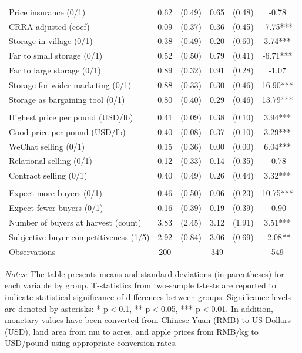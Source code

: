 \documentclass[12pt]{article}
\begin{document}
\begin{table}[H]
{\begin{tabular}{lccccc}
Price insurance (0/1) & 0.62 & (0.49) & 0.65 & (0.48) & -0.78 \\
CRRA adjusted (coef) & 0.09 & (0.37) & 0.36 & (0.45) & -7.75*** \\
Storage in village (0/1) & 0.38 & (0.49) & 0.20 & (0.60) & 3.74*** \\
Far to small storage (0/1) & 0.52 & (0.50) & 0.79 & (0.41) & -6.71*** \\
Far to large storage (0/1) & 0.89 & (0.32) & 0.91 & (0.28) & -1.07 \\
Storage for wider marketing (0/1) & 0.88 & (0.33) & 0.30 & (0.46) & 16.90*** \\
Storage as bargaining tool (0/1) & 0.80 & (0.40) & 0.29 & (0.46) & 13.79*** \\
\addlinespace
\multicolumn{6}{l}{\textbf{Panel D: Marketing}} \\
Highest price per pound (USD/lb) & 0.41 & (0.09) & 0.38 & (0.10) & 3.94*** \\
Good price per pound (USD/lb) & 0.40 & (0.08) & 0.37 & (0.10) & 3.29*** \\
WeChat selling (0/1) & 0.15 & (0.36) & 0.00 & (0.00) & 6.04*** \\
Relational selling (0/1) & 0.12 & (0.33) & 0.14 & (0.35) & -0.78 \\
Contract selling (0/1) & 0.40 & (0.49) & 0.26 & (0.44) & 3.32*** \\
\addlinespace
\multicolumn{6}{l}{\textbf{Panel E: Market Competitive Conditions}} \\
Expect more buyers (0/1) & 0.46 & (0.50) & 0.06 & (0.23) & 10.75*** \\
Expect fewer buyers (0/1) & 0.16 & (0.39) & 0.19 & (0.39) & -0.90 \\
Number of buyers at harvest (count) & 3.83 & (2.45) & 3.12 & (1.91) & 3.51*** \\
Subjective buyer competitiveness (1/5) & 2.92 & (0.84) & 3.06 & (0.69) & -2.08** \\
\hline
\hline
Observations & 200 & & 349 & & 549 \\
\bottomrule
\end{tabular}%
} %
\begin{tablenotes} 
\item \textit{Notes:} The table presents means and standard deviations (in parentheses) for each variable by group. T-statistics from two-sample t-tests are reported to indicate statistical significance of differences between groups. Significance levels are denoted by asterisks: * p$<$0.1, ** p$<$0.05, *** p$<$0.01. In addition, monetary values have been converted from Chinese Yuan (RMB) to US Dollars (USD), land area from mu to acres, and apple prices from RMB/kg to USD/pound using appropriate conversion rates. 
\end{tablenotes} 
\end{table}
\end{document}
